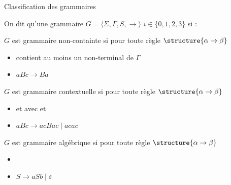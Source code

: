 
\begingroup

\begin{frame}{Classification des grammaires}

  On dit qu'une grammaire $G = \langle \Sigma, \Gamma, S, \rightarrow \rangle$  $i \in \{0, 1, 2, 3\}$ si :
  \begin{description}[xType 0 :]
  \item[Type 0 :] \vspace{2mm} $G$ est grammaire \alert{non-containte} si pour toute règle $\structure{\alpha \rightarrow \beta}$ \\
    \begin{itemize}
    \item \structure{$\alpha$} contient au moins un non-terminal de $\Gamma$
    \item[\example{Exemple :}] $a B c \rightarrow B a$
    \end{itemize}
  \item[Type 1 :] \vspace{2mm}$G$ est grammaire \alert{contextuelle} si pour toute règle $\structure{\alpha \rightarrow \beta}$ \\
    \begin{itemize}
    \item {} et  avec  et \structure{$\gamma \neq \varepsilon$}
    \item[\example{Exemple :}] $a B c \rightarrow ac B ac \mid acac$ 
    \end{itemize}
  \item[Type 2 :] \vspace{2mm}$G$ est grammaire \alert{algébrique} si pour toute règle $\structure{\alpha \rightarrow \beta}$ \\
    \begin{itemize}
    \item \structure{$\alpha \in \Gamma$}
    \item[\example{Exemple :}] $S \rightarrow a S b \mid \varepsilon$ 
    \end{itemize}


\end{description}
\end{frame}
